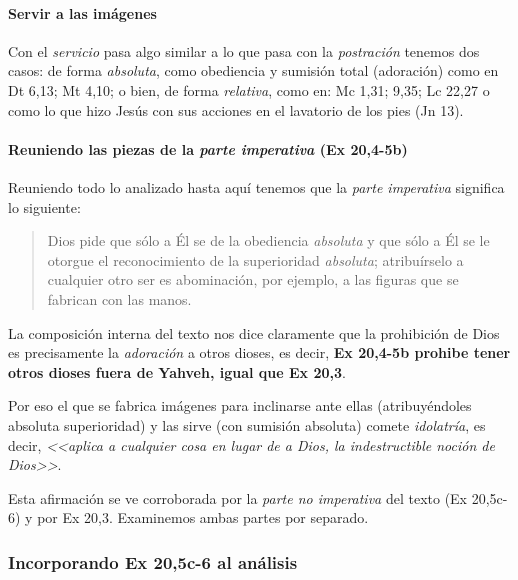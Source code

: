 \documentclass{article}
\begin{document}

\paragraph{Servir a las im\'agenes}

Con el \emph{servicio} pasa algo similar a lo que pasa con la \emph{postraci\'on} tenemos dos casos: de forma \emph{absoluta}, como obediencia y sumisi\'on total (adoraci\'on) como en  Dt 6,13; Mt 4,10; o bien, de forma \emph{relativa}, como en: Mc 1,31; 9,35; Lc 22,27 o como lo que hizo Jes\'us con sus acciones en el lavatorio de los pies (Jn 13).

\paragraph{Reuniendo las piezas de la \emph{parte imperativa} (Ex 20,4-5b)}

Reuniendo todo lo analizado hasta aqu\'{i} tenemos que la \emph{parte imperativa} significa lo siguiente:

\begin{quote}
Dios pide que s\'olo a \'El se de la obediencia \emph{absoluta} y que s\'olo a \'El se le otorgue el reconocimiento de la superioridad \emph{absoluta}; atribu\'{i}rselo a cualquier otro ser es abominaci\'on, por ejemplo, a las figuras que se fabrican con las manos. 
\end{quote}

\noindent
La composici\'on interna del texto nos dice claramente que la prohibici\'on de Dios es precisamente la \emph{adoraci\'on} a otros dioses, es decir, \textbf{Ex 20,4-5b prohibe tener otros dioses fuera de Yahveh, igual que Ex 20,3}.

Por eso el que se fabrica im\'agenes para inclinarse ante ellas (atribuy\'endoles absoluta superioridad) y las sirve (con sumisi\'on absoluta) comete \emph{idolatr\'{i}a}, es decir, \emph{<<aplica a cualquier cosa en lugar de a Dios, la indestructible noci\'on de Dios>>}.

Esta afirmaci\'on se ve corroborada por la \emph{parte no imperativa} del texto (Ex 20,5c-6) y por Ex 20,3. Examinemos ambas partes por separado.

\subsubsection{Incorporando Ex 20,5c-6 al an\'alisis}
\end{document}

